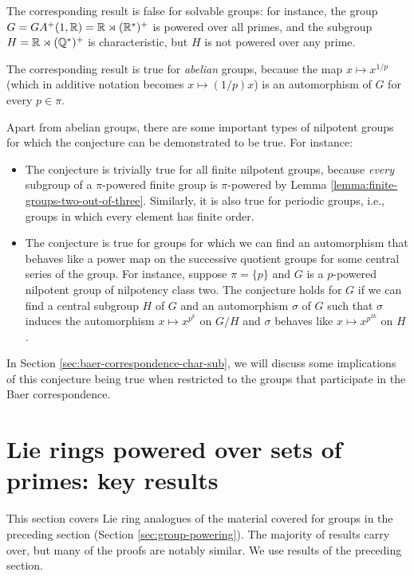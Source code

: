 The corresponding result is false for solvable groups: for instance,
the group $G = GA^+(1,\mathbb{R}) = \mathbb{R} \rtimes (\mathbb{R}^*)^+$ is powered over all
primes, and the subgroup $H = \mathbb{R} \rtimes (\mathbb{Q}^*)^+$ is characteristic,
but $H$ is not powered over any prime.

The corresponding result is true for {\em abelian} groups, because the
map $x \mapsto x^{1/p}$ (which in additive notation becomes $x \mapsto
(1/p)x$) is an automorphism of $G$ for every $p \in \pi$.

Apart from abelian groups, there are some important types of nilpotent
groups for which the conjecture can be demonstrated to be true. For instance:

\begin{itemize}
\item The conjecture is trivially true for all finite nilpotent
  groups, because {\em every} subgroup of a $\pi$-powered finite group
  is $\pi$-powered by Lemma
  \ref{lemma:finite-groups-two-out-of-three}. Similarly, it is also true
  for periodic groups, i.e., groups in which every element has finite order.
\item The conjecture is true for groups for which we can find an
  automorphism that behaves like a power map on the successive
  quotient groups for some central series of the group. For instance,
  suppose $\pi = \{ p \}$ and $G$ is a $p$-powered nilpotent group of
  nilpotency class two. The conjecture holds for $G$ if we can find a
  central subgroup $H$ of $G$ and an automorphism $\sigma$ of $G$ such
  that $\sigma$ induces the automorphism $x \mapsto x^{p^k}$ on $G/H$
  and $\sigma$ behaves like $x \mapsto x^{p^{2k}}$ on $H$.
\end{itemize}

In Section \ref{sec:baer-correspondence-char-sub}, we will discuss
some implications of this conjecture being true when restricted to the
groups that participate in the Baer correspondence.


\section{Lie rings powered over sets of primes: key results}\label{sec:lie-ring-powering}

This section covers Lie ring analogues of the material covered for
groups in the preceding section (Section
\ref{sec:group-powering}). The majority of results carry over, but
many of the proofs are notably similar. We use results of the
preceding section.

